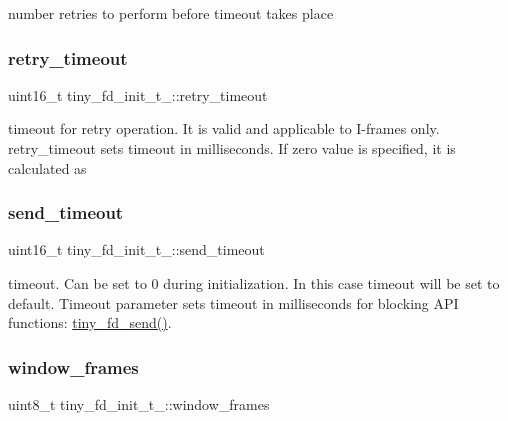 number retries to perform before timeout takes place \mbox{\label{structtiny__fd__init__t___a54b9c689fba5aae8ccc0c29f05a159ca}} 
\subsubsection{\texorpdfstring{retry\+\_\+timeout}{retry\_timeout}}
{\footnotesize\ttfamily uint16\+\_\+t tiny\+\_\+fd\+\_\+init\+\_\+t\+\_\+\+::retry\+\_\+timeout}

timeout for retry operation. It is valid and applicable to I-\/frames only. retry\+\_\+timeout sets timeout in milliseconds. If zero value is specified, it is calculated as \mbox{\label{structtiny__fd__init__t___ae6653af324c07711c4b20360760c3e3a}} 
\subsubsection{\texorpdfstring{send\+\_\+timeout}{send\_timeout}}
{\footnotesize\ttfamily uint16\+\_\+t tiny\+\_\+fd\+\_\+init\+\_\+t\+\_\+\+::send\+\_\+timeout}

timeout. Can be set to 0 during initialization. In this case timeout will be set to default. Timeout parameter sets timeout in milliseconds for blocking A\+PI functions\+: \hyperlink{group__FULL__DUPLEX__API_ga490157ee98ea6148f99a5bb1f26c5f60}{tiny\+\_\+fd\+\_\+send()}. \mbox{\label{structtiny__fd__init__t___ae4da012c3e39c4e7dda587191b4c2f77}} 
\subsubsection{\texorpdfstring{window\+\_\+frames}{window\_frames}}
{\footnotesize\ttfamily uint8\+\_\+t tiny\+\_\+fd\+\_\+init\+\_\+t\+\_\+\+::window\+\_\+frames}

